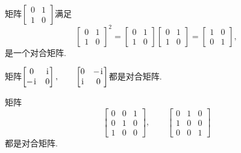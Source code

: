 \begin{example}
矩阵\(
	\begin{bmatrix}
		0 & 1 \\
		1 & 0
	\end{bmatrix}
\)满足\begin{equation*}
	\begin{bmatrix}
		0 & 1 \\
		1 & 0
	\end{bmatrix}^2
	=
	\begin{bmatrix}
		0 & 1 \\
		1 & 0
	\end{bmatrix}
	\begin{bmatrix}
		0 & 1 \\
		1 & 0
	\end{bmatrix}
	= \begin{bmatrix}
		1 & 0 \\
		0 & 1
	\end{bmatrix},
\end{equation*}是一个对合矩阵.
\end{example}
\begin{example}
矩阵\(
	\begin{bmatrix}
		0 & \kern1pt\mathrm{i}\kern1pt \\
		-\kern1pt\mathrm{i}\kern1pt & 0
	\end{bmatrix},
	\qquad
	\begin{bmatrix}
		0 & -\kern1pt\mathrm{i}\kern1pt \\
		\kern1pt\mathrm{i}\kern1pt & 0
	\end{bmatrix}
\)都是对合矩阵.
\end{example}
\begin{example}
矩阵\begin{equation*}
	\begin{bmatrix}
		0 & 0 & 1 \\
		0 & 1 & 0 \\
		1 & 0 & 0
	\end{bmatrix},
	\qquad
	\begin{bmatrix}
		0 & 1 & 0 \\
		1 & 0 & 0 \\
		0 & 0 & 1
	\end{bmatrix}
\end{equation*}都是对合矩阵.
\end{example}

